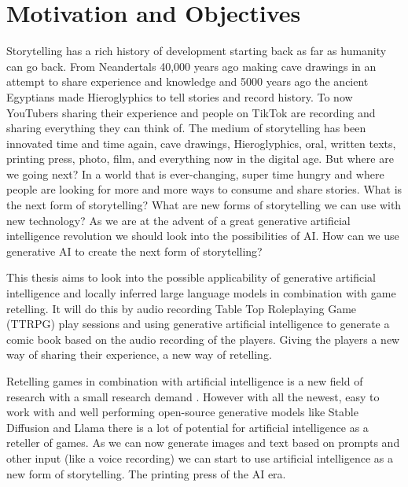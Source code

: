 \section{Motivation and Objectives}

Storytelling has a rich history of development starting back as far as humanity can go back. From Neandertals 40,000 years ago making cave drawings in an attempt to share experience and knowledge and 5000 years ago the ancient Egyptians made Hieroglyphics to tell stories and record history. To now YouTubers sharing their experience and people on TikTok are recording and sharing everything they can think of. The medium of storytelling has been innovated time and time again, cave drawings, Hieroglyphics, oral, written texts, printing press, photo, film, and everything now in the digital age. But where are we going next? In a world that is ever-changing, super time hungry and where people are looking for more and more ways to consume and share stories. What is the next form of storytelling? What are new forms of storytelling we can use with new technology? As we are at the advent of a great generative artificial intelligence revolution we should look into the possibilities of AI. How can we use generative AI to create the next form of storytelling?

This thesis aims to look into the possible applicability of generative artificial intelligence and locally inferred large language models in combination with game retelling. It will do this by audio recording Table Top Roleplaying Game (TTRPG) play sessions and using generative artificial intelligence to generate a comic book based on the audio recording of the players. Giving the players a new way of sharing their experience, a new way of retelling.

Retelling games in combination with artificial intelligence is a new field of research with a small research demand \cite{Gallotta2024LLM}. However with all the newest, easy to work with and well performing open-source generative models like Stable Diffusion \cite{StableDiffusionGit} and Llama \cite{touvron2023llamaopenefficientfoundation} there is a lot of potential for artificial intelligence as a reteller of games. As we can now generate images and text based on prompts and other input (like a voice recording) we can start to use artificial intelligence as a new form of storytelling. The printing press of the AI era.


